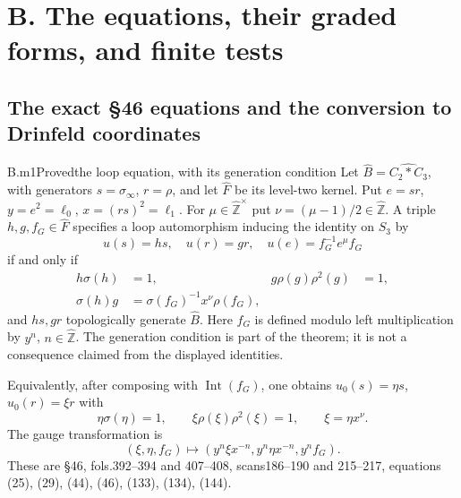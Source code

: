 \section{B. The equations, their graded forms, and finite tests}

\subsection{The exact \S46 equations and the conversion to Drinfeld coordinates}

\begin{claim}{B.m1}{Proved}{the loop equation, with its generation condition}
Let $\widehat B=\widehat{C_2*C_3}$, with generators $s=\sigma_\infty$, $r=\rho$, and let $\widehat F$ be its level-two kernel. Put $e=sr$, $y=e^2=\ell_0$, $x=(rs)^2=\ell_1$. For $\mu\in\widehat{\mathbb Z}^{\times}$ put $\nu=(\mu-1)/2\in\widehat{\mathbb Z}$. A triple $h,g,f_G\in\widehat F$ specifies a loop automorphism inducing the identity on $S_3$ by
\[
 u(s)=hs,\quad u(r)=gr,\quad u(e)=f_G^{-1}e^\mu f_G
\]
if and only if
\begin{align*}
 h\sigma(h)&=1,&g\rho(g)\rho^2(g)&=1,\\
 \sigma(h)g&=\sigma(f_G)^{-1}x^\nu\rho(f_G),
\end{align*}
and $hs,gr$ topologically generate $\widehat B$. Here $f_G$ is defined modulo left multiplication by $y^n$, $n\in\widehat{\mathbb Z}$. The generation condition is part of the theorem; it is not a consequence claimed from the displayed identities.

Equivalently, after composing with $\operatorname{Int}(f_G)$, one obtains $u_0(s)=\eta s$, $u_0(r)=\xi r$ with
\begin{equation}\label{eq:LM46}
 \eta\sigma(\eta)=1,\qquad
 \xi\rho(\xi)\rho^2(\xi)=1,\qquad
 \xi=\eta x^\nu.
\end{equation}
The gauge transformation is
\[
 (\xi,\eta,f_G)\longmapsto
 (y^n\xi x^{-n},y^n\eta x^{-n},y^nf_G).
\]
These are \S46, fols.392--394 and 407--408, scans186--190 and 215--217, equations (25), (29), (44), (46), (133), (134), (144).

\end{claim}
